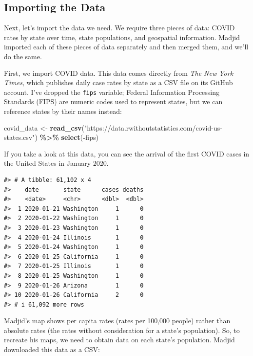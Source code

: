 \documentclass[
]{book}
\newenvironment{Shaded}{\begin{snugshade}}{\end{snugshade}}
\newcommand{\FunctionTok}[1]{\textcolor[rgb]{0.13,0.29,0.53}{\textbf{#1}}}
\newcommand{\NormalTok}[1]{#1}
\newcommand{\OtherTok}[1]{\textcolor[rgb]{0.56,0.35,0.01}{#1}}
\newcommand{\SpecialCharTok}[1]{\textcolor[rgb]{0.81,0.36,0.00}{\textbf{#1}}}
\newcommand{\StringTok}[1]{\textcolor[rgb]{0.31,0.60,0.02}{#1}}
\begin{document}
\hypertarget{importing-the-data}{%
\subsection*{Importing the Data}\label{importing-the-data}}

Next, let's import the data we need. We require three pieces of data: COVID rates by state over time, state populations, and geospatial information. Madjid imported each of these pieces of data separately and then merged them, and we'll do the same.

First, we import COVID data. This data comes directly from \emph{The New York Times}, which publishes daily case rates by state as a CSV file on its GitHub account. I've dropped the \texttt{fips} variable; Federal Information Processing Standards (FIPS) are numeric codes used to represent states, but we can reference states by their names instead:

\begin{Shaded}
\begin{Highlighting}[]
\NormalTok{covid\_data }\OtherTok{\textless{}{-}} \FunctionTok{read\_csv}\NormalTok{(}\StringTok{"https://data.rwithoutstatistics.com/covid{-}us{-}states.csv"}\NormalTok{) }\SpecialCharTok{\%\textgreater{}\%}
  \FunctionTok{select}\NormalTok{(}\SpecialCharTok{{-}}\NormalTok{fips)}
\end{Highlighting}
\end{Shaded}

If you take a look at this data, you can see the arrival of the first COVID cases in the United States in January 2020.

\begin{verbatim}
#> # A tibble: 61,102 x 4
#>    date       state      cases deaths
#>    <date>     <chr>      <dbl>  <dbl>
#>  1 2020-01-21 Washington     1      0
#>  2 2020-01-22 Washington     1      0
#>  3 2020-01-23 Washington     1      0
#>  4 2020-01-24 Illinois       1      0
#>  5 2020-01-24 Washington     1      0
#>  6 2020-01-25 California     1      0
#>  7 2020-01-25 Illinois       1      0
#>  8 2020-01-25 Washington     1      0
#>  9 2020-01-26 Arizona        1      0
#> 10 2020-01-26 California     2      0
#> # i 61,092 more rows
\end{verbatim}

Madjid's map shows per capita rates (rates per 100,000 people) rather than absolute rates (the rates without consideration for a state's population). So, to recreate his maps, we need to obtain data on each state's population. Madjid downloaded this data as a CSV:
\end{document}
